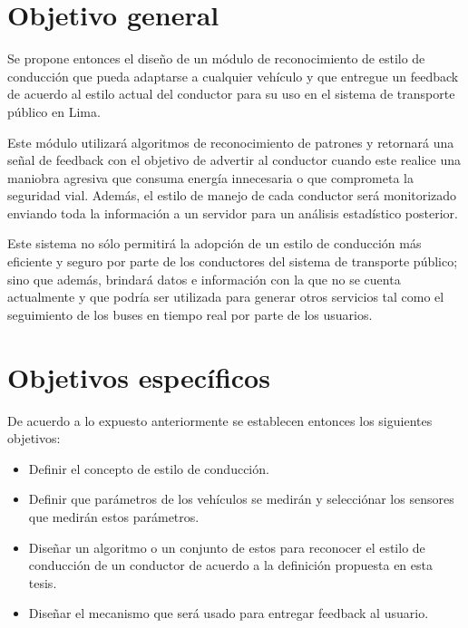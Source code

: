 
\section{Objetivo general}
Se propone entonces el diseño de un módulo de reconocimiento de estilo de conducción que pueda adaptarse a cualquier vehículo y que entregue un feedback de acuerdo al estilo actual del conductor para su uso en el sistema de transporte público en Lima.

Este módulo utilizará algoritmos de reconocimiento de patrones y retornará una señal de feedback con el objetivo de advertir al conductor cuando este realice una maniobra agresiva que consuma energía innecesaria o que comprometa la seguridad vial. Además, el estilo de manejo de cada conductor será monitorizado enviando toda la información a un servidor para un análisis estadístico posterior.

Este sistema no sólo permitirá la adopción de un estilo de conducción más eficiente y seguro por parte de los conductores del sistema de transporte público; sino que además, brindará datos e información con la que no se cuenta actualmente y que podría ser utilizada para generar otros servicios tal como el seguimiento de los buses en tiempo real por parte de los usuarios.

\section{Objetivos específicos}
De acuerdo a lo expuesto anteriormente se establecen entonces los siguientes objetivos:

\begin{itemize}
    \itemsep0em
    \item Definir el concepto de estilo de conducción.
    \item Definir que parámetros de los vehículos se medirán y selecciónar los sensores que medirán estos parámetros.
    \item Diseñar un algoritmo o un conjunto de estos para reconocer el estilo de conducción de un conductor de acuerdo a la definición propuesta en esta tesis.
    \item Diseñar el mecanismo que será usado para entregar feedback al usuario.
\end{itemize}
